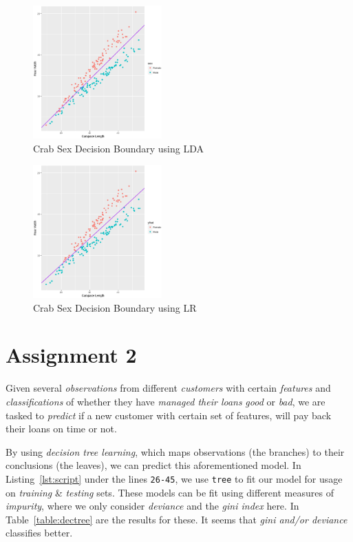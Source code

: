 \documentclass[a4paper, twocolumn]{article}
\begin{document}
        \begin{figure}[h!]
            \centering
            \caption{Crab Sex Decision Boundary using LDA}
            \label{fig:boundarylda}
            \includegraphics[width=0.44\textwidth]{share/boundarylda.eps}
        \end{figure}

        \begin{figure}[h!]
            \centering
            \caption{Crab Sex Decision Boundary using LR}
            \label{fig:boundarylr}
            \includegraphics[width=0.44\textwidth]{share/boundarylr.eps}
        \end{figure}

        \newpage

    \section*{Assignment 2}

        Given several \emph{observations} from different \emph{customers} with certain \emph{features} and \emph{classifications} of whether they have \emph{managed their loans} \emph{good} or \emph{bad}, we are tasked to \emph{predict} if a new customer with certain set of features, will pay back their loans on time or not.

        By using \emph{decision tree learning}, which maps observations (the branches) to their conclusions (the leaves), we can predict this aforementioned model. In Listing~\ref{lst:script} under the lines \texttt{26-45}, we use \texttt{tree} to fit our model for usage on \emph{training} \& \emph{testing} sets. These models can be fit using different measures of \emph{impurity}, where we only consider \emph{deviance} and the \emph{gini index} here. In Table~\ref{table:dectree} are the results for these. It seems that \emph{gini and/or deviance} classifies better.
\end{document}
